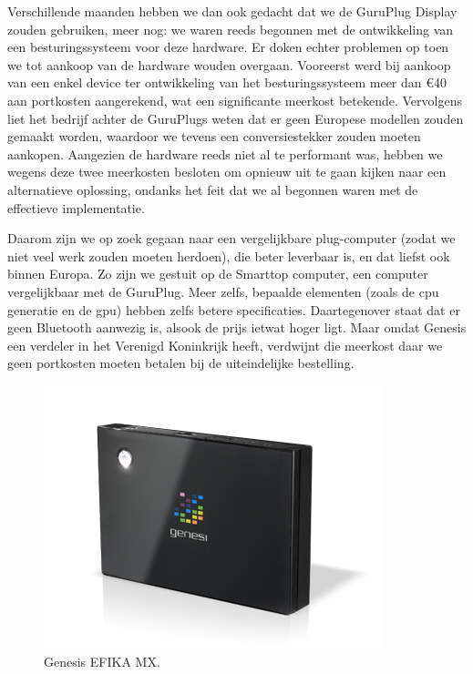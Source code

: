 Verschillende maanden hebben we dan ook gedacht dat we de GuruPlug Display zouden gebruiken, meer nog: we waren reeds begonnen met de ontwikkeling van een besturingssysteem voor deze hardware. Er doken echter problemen op toen we tot aankoop van de hardware wouden overgaan. Vooreerst werd bij aankoop van een enkel device ter ontwikkeling van het besturingssysteem meer dan \euro 40 aan portkosten aangerekend, wat een significante meerkost betekende. Vervolgens liet het bedrijf achter de GuruPlugs weten dat er geen Europese modellen zouden gemaakt worden, waardoor we tevens een conversiestekker zouden moeten aankopen. Aangezien de hardware reeds niet al te performant was, hebben we wegens deze twee meerkosten besloten om opnieuw uit te gaan kijken naar een alternatieve oplossing, ondanks het feit dat we al begonnen waren met de effectieve implementatie.

Daarom zijn we op zoek gegaan naar een vergelijkbare plug-computer (zodat we niet veel werk zouden moeten herdoen), die beter leverbaar is, en dat liefst ook binnen Europa. Zo zijn we gestuit op de  Smarttop computer, een computer vergelijkbaar met de GuruPlug. Meer zelfs, bepaalde elementen (zoals de \ac{cpu} generatie en de \ac{gpu}) hebben zelfs betere specificaties. Daartegenover staat dat er geen Bluetooth aanwezig is, alsook de prijs ietwat hoger ligt. Maar omdat Genesis een verdeler in het Verenigd Koninkrijk heeft, verdwijnt die meerkost daar we geen portkosten moeten betalen bij de uiteindelijke bestelling.

\begin{figure}
	\includegraphics[width=\textwidth]{afbeeldingen/EFIKA_MX}
	\caption{Genesis EFIKA MX.}
\end{figure}

